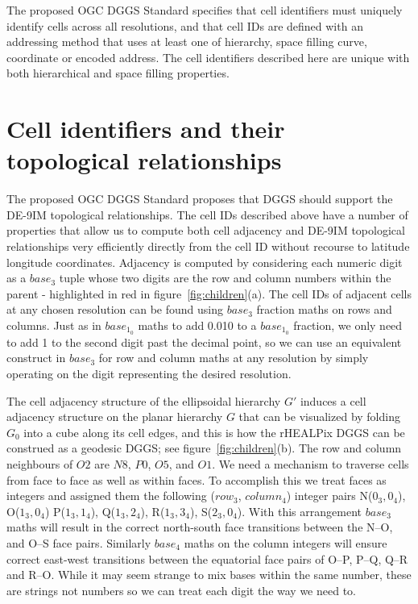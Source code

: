 \documentclass[12pt]{iopart}
\begin{document}
The proposed OGC DGGS Standard specifies that cell identifiers must uniquely identify cells across all resolutions, and that cell IDs are defined with an addressing method that uses at least one of hierarchy, space filling curve, coordinate or encoded address. The cell identifiers described here are unique with both hierarchical and space filling properties.

\section{Cell identifiers and their topological relationships}\label{sec:cellgeom}
The proposed OGC DGGS Standard proposes that DGGS should support the DE-9IM topological relationships. The cell IDs described above have a number of properties that allow us to compute both cell adjacency and DE-9IM topological relationships very efficiently directly from the cell ID without recourse to latitude longitude coordinates. Adjacency is computed by considering each numeric digit as a $base_3$ tuple whose two digits are the row and column numbers within the parent - highlighted in red in figure~\ref{fig:children}(a). The cell IDs of adjacent cells at any chosen resolution can be found using $base_3$ fraction maths on rows and columns. Just as in $base_1_0$ maths to add 0.010 to a $base_1_0$ fraction, we only need to add 1 to the second digit past the decimal point, so we can use an equivalent construct in $base_3$ for row and column maths at any resolution by simply operating on the digit representing the desired resolution.

The cell adjacency structure of the ellipsoidal hierarchy $G'$ induces a cell adjacency structure on the planar hierarchy $G$ that can be visualized by folding $G_0$ into a cube along its cell edges, and this is how the rHEALPix DGGS can be construed as a geodesic DGGS; see figure~\ref{fig:children}(b). The row and column neighbours of $O2$ are $N8$, $P0$, $O5$, and $O1$. We need a mechanism to traverse cells from face to face as well as within faces. To accomplish this we treat faces as integers and assigned them the following ($row_3$, $column_4$) integer pairs N($0_3,0_4$), O($1_3,0_4$) P($1_3,1_4$), Q($1_3,2_4$), R($1_3,3_4$), S($2_3,0_4$). With this arrangement $base_3$ maths will result in the correct north-south face transitions between the N--O, and O--S face pairs. Similarly $base_4$ maths on the column integers will ensure correct east-west  transitions between the equatorial face pairs of O--P, P--Q, Q--R and R--O. While it may seem strange to mix bases within the same number, these are strings not numbers so we can treat each digit the way we need to.
\end{document}
